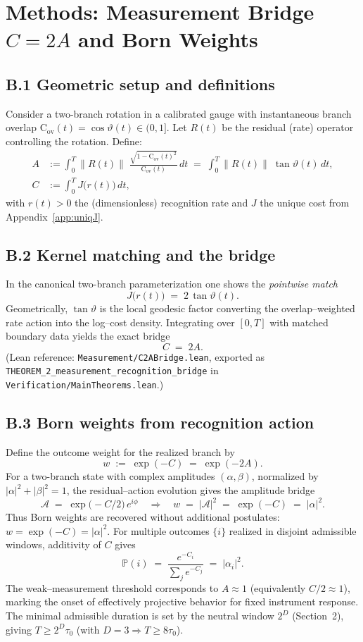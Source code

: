\documentclass[12pt,a4paper]{article}
\begin{document}
\section{Methods: Measurement Bridge $C=2A$ and Born Weights}\label{app:C2A}

\subsection*{B.1 Geometric setup and definitions}
Consider a two-branch rotation in a calibrated gauge with instantaneous branch overlap $\mathrm{C}_{\mathrm{ov}}(t)=\cos\vartheta(t)\in(0,1]$. Let $R(t)$ be the residual (rate) operator controlling the rotation. Define:
\begin{align}
  A &:= \int_{0}^{T} \bigl\|R(t)\bigr\|\;\frac{\sqrt{1-\mathrm{C}_{\mathrm{ov}}(t)^2}}{\mathrm{C}_{\mathrm{ov}}(t)}\,dt
      \;=\;\int_{0}^{T}\bigl\|R(t)\bigr\|\;\tan\vartheta(t)\,dt,\\
  C &:= \int_{0}^{T} J\!\bigl(r(t)\bigr)\,dt,
\end{align}
with $r(t)>0$ the (dimensionless) recognition rate and $J$ the unique cost from Appendix~\ref{app:uniqJ}.

\subsection*{B.2 Kernel matching and the bridge}
In the canonical two-branch parameterization one shows the \emph{pointwise match}
\[
  J\!\bigl(r(t)\bigr)\;=\;2\,\tan\vartheta(t).
\]
Geometrically, $\tan\vartheta$ is the local geodesic factor converting the overlap–weighted rate action into the log–cost density. Integrating over $[0,T]$ with matched boundary data yields the exact bridge
\[
  C\;=\;2A.
\]
(Lean reference: \texttt{Measurement/C2ABridge.lean}, exported as \texttt{THEOREM\_2\_measurement\_recognition\_bridge} in \texttt{Verification/MainTheorems.lean}.)

\subsection*{B.3 Born weights from recognition action}
Define the outcome weight for the realized branch by
\[
  w\;:=\;\exp(-C)\;=\;\exp(-2A).
\]
For a two-branch state with complex amplitudes $(\alpha,\beta)$, normalized by $|\alpha|^{2}+|\beta|^{2}=1$, the residual–action evolution gives the amplitude bridge
\[
  \mathcal{A}\;=\;\exp\!\bigl(-C/2\bigr)\,e^{i\phi}\quad\Rightarrow\quad
  w\;=\;|\mathcal{A}|^{2}\;=\;\exp(-C)\;=\;|\alpha|^{2}.
\]
Thus Born weights are recovered without additional postulates: $w=\exp(-C)=|\alpha|^{2}$. For multiple outcomes $\{i\}$ realized in disjoint admissible windows, additivity of $C$ gives
\[
  \mathbb{P}(i)\;=\;\frac{e^{-C_i}}{\sum_j e^{-C_j}}\;=\;|\alpha_i|^{2}.
\]
The weak–measurement threshold corresponds to $A\approx 1$ (equivalently $C/2\approx 1$), marking the onset of effectively projective behavior for fixed instrument response. The minimal admissible duration is set by the neutral window $2^{D}$ (Section~2), giving $T\ge 2^{D}\tau_{0}$ (with $D=3\Rightarrow T\ge 8\tau_{0}$).
\end{document}
